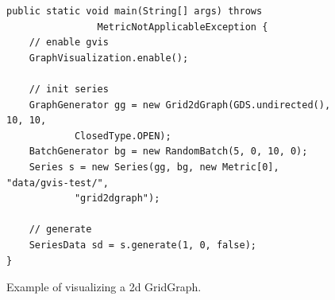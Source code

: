 \begin{figure} [h]
\begin{lstlisting}
public static void main(String[] args) throws
				MetricNotApplicableException {
	// enable gvis
	GraphVisualization.enable();
			
	// init series
	GraphGenerator gg = new Grid2dGraph(GDS.undirected(), 10, 10,
			ClosedType.OPEN);
	BatchGenerator bg = new RandomBatch(5, 0, 10, 0);
	Series s = new Series(gg, bg, new Metric[0], "data/gvis-test/",
			"grid2dgraph");
				
	// generate
	SeriesData sd = s.generate(1, 0, false);
}

\end{lstlisting}
\caption{Example of visualizing a 2d GridGraph.}
\label{code:gridGraph}
\end{figure}